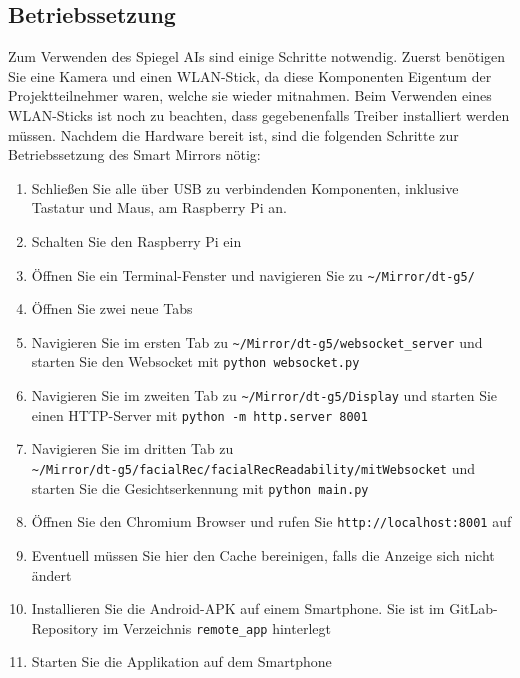 \subsection{Betriebssetzung}
Zum Verwenden des Spiegel AIs sind einige Schritte notwendig. Zuerst benötigen Sie eine Kamera und einen WLAN-Stick, da diese Komponenten Eigentum der Projektteilnehmer waren, welche sie wieder mitnahmen. Beim Verwenden eines WLAN-Sticks ist noch zu beachten, dass gegebenenfalls Treiber installiert werden müssen. Nachdem die Hardware bereit ist, sind die folgenden Schritte zur Betriebssetzung des Smart Mirrors nötig:
\begin{enumerate}
	\item Schließen Sie alle über USB zu verbindenden Komponenten, inklusive Tastatur und Maus, am Raspberry Pi an.
	\item Schalten Sie den Raspberry Pi ein
	\item Öffnen Sie ein Terminal-Fenster und navigieren Sie zu \verb|~/Mirror/dt-g5/|
	\item Öffnen Sie zwei neue Tabs
	\item Navigieren Sie im ersten Tab zu \verb|~/Mirror/dt-g5/websocket_server| und starten Sie den Websocket mit \texttt{python websocket.py}
	\item Navigieren Sie im zweiten Tab zu \verb|~/Mirror/dt-g5/Display| und starten Sie einen HTTP-Server mit \texttt{python -m http.server 8001}
	\item Navigieren Sie im dritten Tab zu \\ \verb|~/Mirror/dt-g5/facialRec/facialRecReadability/mitWebsocket| und starten Sie die Gesichtserkennung mit \texttt{python main.py}
	\item Öffnen Sie den Chromium Browser und rufen Sie \texttt{http://localhost:8001} auf
	\item Eventuell müssen Sie hier den Cache bereinigen, falls die Anzeige sich nicht ändert
	\item Installieren Sie die Android-APK auf einem Smartphone. Sie ist im GitLab-Repository im Verzeichnis \texttt{remote\_app} hinterlegt
	\item Starten Sie die Applikation auf dem Smartphone
\end{enumerate}
